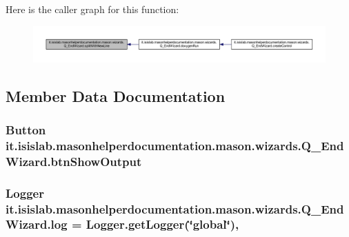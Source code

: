 Here is the caller graph for this function\-:\nopagebreak
\begin{figure}[H]
\begin{center}
\leavevmode
\includegraphics[width=350pt]{classit_1_1isislab_1_1masonhelperdocumentation_1_1mason_1_1wizards_1_1_q___end_wizard_a1cdec1efdad895973386d4679b790a1c_icgraph}
\end{center}
\end{figure}




\subsection{Member Data Documentation}
\hypertarget{classit_1_1isislab_1_1masonhelperdocumentation_1_1mason_1_1wizards_1_1_q___end_wizard_adabc78dc53c9ffd3c77d6e453db02cb6}{
\subsubsection[{btn\-Show\-Output}]{\setlength{\rightskip}{0pt plus 5cm}Button it.\-isislab.\-masonhelperdocumentation.\-mason.\-wizards.\-Q\-\_\-\-End\-Wizard.\-btn\-Show\-Output\hspace{0.3cm}{\ttfamily [private]}}}\label{classit_1_1isislab_1_1masonhelperdocumentation_1_1mason_1_1wizards_1_1_q___end_wizard_adabc78dc53c9ffd3c77d6e453db02cb6}
\hypertarget{classit_1_1isislab_1_1masonhelperdocumentation_1_1mason_1_1wizards_1_1_q___end_wizard_a032febc0039ba8338e90779e48032ce4}{
\subsubsection[{log}]{\setlength{\rightskip}{0pt plus 5cm}Logger it.\-isislab.\-masonhelperdocumentation.\-mason.\-wizards.\-Q\-\_\-\-End\-Wizard.\-log = Logger.\-get\-Logger(\char`\"{}global\char`\"{})\hspace{0.3cm}{\ttfamily [static]}, {\ttfamily [private]}}}\label{classit_1_1isislab_1_1masonhelperdocumentation_1_1mason_1_1wizards_1_1_q___end_wizard_a032febc0039ba8338e90779e48032ce4}
